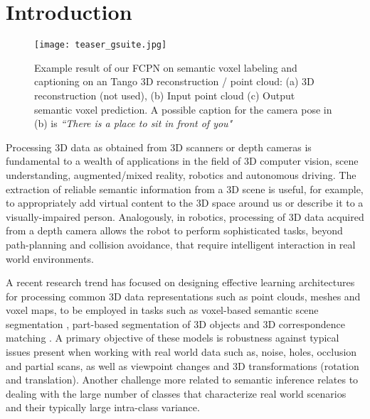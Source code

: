 \documentclass[runningheads]{llncs}
\begin{document}
\section{Introduction}

\begin{figure}[t]
    \centering
 \texttt{[image: teaser\_gsuite.jpg]} 
    \caption{Example result of our FCPN on semantic voxel labeling and captioning on an Tango 3D reconstruction / point cloud: (a) 3D reconstruction (not used), (b) Input point cloud (c) Output semantic voxel prediction. A possible caption for the camera pose in (b) is \textit{``There is a place to sit in front of you"}}
    \label{fig:teaser} 
\end{figure}

Processing 3D data as obtained from 3D scanners or depth cameras is fundamental to a wealth of applications in the field of 3D computer vision, scene understanding, augmented/mixed reality, robotics and autonomous driving. 
The extraction of reliable semantic information from a 3D scene is useful, for example, to appropriately add virtual content to the 3D space around us or describe it to a visually-impaired person. %
Analogously, in robotics, processing of 3D data acquired from a depth camera allows the robot to perform sophisticated tasks, beyond path-planning and collision avoidance, that require intelligent interaction in real world environments.

A recent research trend has focused on designing effective learning architectures for processing common 3D data representations such as point clouds, meshes and voxel maps, to be employed in tasks such as voxel-based semantic scene segmentation \cite{Dai2017}, part-based segmentation of 3D objects \cite{Qi2017} and 3D correspondence matching \cite{Zeng2016}. A primary objective of these models is robustness against typical issues present when working with real world data such as, noise, holes, occlusion and partial scans, as well as viewpoint changes and 3D transformations (rotation and translation). Another challenge more related to semantic inference relates to dealing with the large number of classes that characterize real world scenarios and their typically large intra-class variance. 
\end{document}
